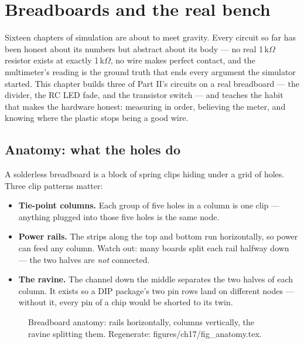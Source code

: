 \chapter{Breadboards and the real bench}\label{ch:breadboard}

Sixteen chapters of simulation are about to meet gravity. Every
circuit so far has been honest about its numbers but abstract about
its body --- no real 1\,k$\Omega$ resistor exists at exactly
1\,k$\Omega$, no wire makes perfect contact, and the multimeter's
reading is the ground truth that ends every argument the simulator
started. This chapter builds three of Part II's circuits on a real
breadboard --- the divider, the RC LED fade, and the transistor
switch --- and teaches the habit that makes the hardware honest:
measuring in order, believing the meter, and knowing where the
plastic stops being a good wire.

\section{Anatomy: what the holes do}\label{sec:anatomy17}

A solderless breadboard is a block of spring clips hiding under a
grid of holes. Three clip patterns matter:

\begin{itemize}
\item \textbf{Tie-point columns.} Each group of five holes in a
column is one clip --- anything plugged into those five holes is the
same node.
\item \textbf{Power rails.} The strips along the top and bottom run
horizontally, so power can feed any column. Watch out: many boards
split each rail halfway down --- the two halves are \emph{not}
connected.
\item \textbf{The ravine.} The channel down the middle separates the
two halves of each column. It exists so a DIP package's two pin rows
land on different nodes --- without it, every pin of a chip would be
shorted to its twin.
\end{itemize}

\begin{figure}[htbp]
\centering

\caption{Breadboard anatomy: rails horizontally, columns vertically,
the ravine splitting them. Regenerate: \ttfamily
figures/ch17/fig\_anatomy.tex.}
\label{fig:anatomy17}
\end{figure}

